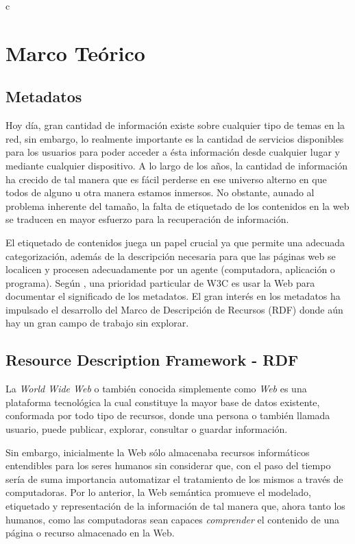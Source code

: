 c\renewcommand{\chaptername}{Capitulo}
\chapter{Marco Teórico} 
\section{Metadatos}

Hoy día, gran cantidad de información existe sobre cualquier tipo de temas en la red, sin embargo, lo realmente importante es la cantidad de servicios disponibles para los usuarios para poder acceder a ésta información desde cualquier lugar y mediante cualquier dispositivo. A lo largo de los años, la cantidad de información ha crecido de tal manera que es fácil perderse en ese universo alterno en que todos de alguno u otra manera estamos inmersos. No obstante, aunado al problema inherente del tamaño, la falta de etiquetado de los contenidos en la web se traducen en mayor esfuerzo para la recuperación de información.\newline

El etiquetado de contenidos juega un papel crucial ya que permite una adecuada categorización, además de la descripción necesaria para que las páginas web se localicen y procesen adecuadamente por un agente (computadora, aplicación o programa). Según \cite{W3C}, una prioridad particular de W3C es usar la Web para documentar el significado de los metadatos. El gran interés en los metadatos ha impulsado el desarrollo del Marco de Descripción de Recursos (RDF) donde aún hay un gran campo de trabajo sin explorar.\newline



\section{Resource Description Framework - RDF}

La \textit{World Wide Web} o también conocida simplemente como \textit{Web} es una plataforma tecnológica la cual constituye la mayor base de datos existente, conformada por todo tipo de recursos, donde una persona o también llamada usuario, puede publicar, explorar, consultar o guardar información.\newline

Sin embargo, inicialmente la Web sólo almacenaba recursos informáticos entendibles para los seres humanos sin considerar que, con el paso del tiempo sería de suma importancia automatizar el tratamiento de los mismos a través de computadoras. Por lo anterior, la Web semántica promueve el modelado, etiquetado y representación de la información de tal manera que, ahora tanto los humanos, como las computadoras sean capaces \textit{comprender} el contenido de una página o recurso almacenado en la Web.

